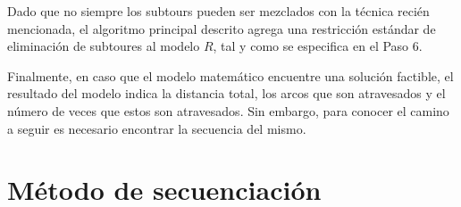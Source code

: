 Dado que no siempre los subtours pueden ser mezclados con la técnica recién mencionada, el algoritmo principal descrito agrega una restricción estándar de eliminación de subtoures al modelo $R$, tal y como se especifica en el Paso 6.

Finalmente, en caso que el modelo matemático encuentre una solución factible, el resultado del modelo indica la distancia total, los arcos que son atravesados y el número de veces que estos son atravesados. Sin embargo, para conocer el camino a seguir es necesario encontrar la secuencia del mismo. 

\section{Método de secuenciación}




